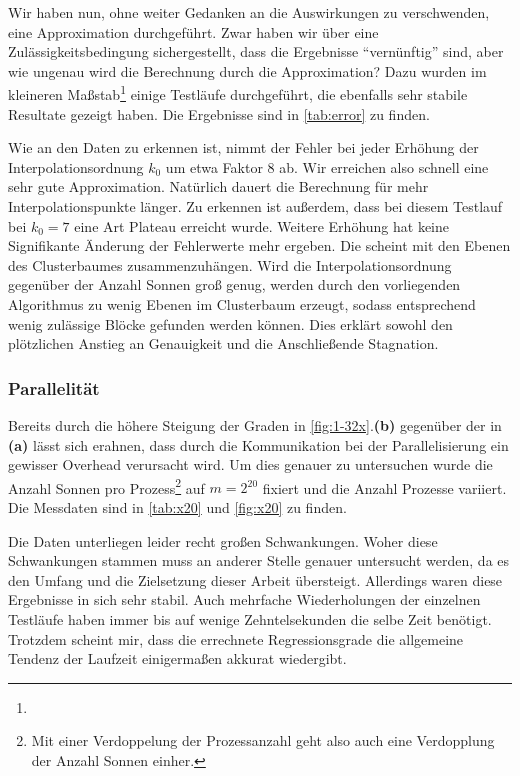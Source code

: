   Wir haben nun, ohne weiter Gedanken an die Auswirkungen zu verschwenden, eine Approximation durchgeführt. Zwar haben wir über eine Zulässigkeitsbedingung sichergestellt, dass die Ergebnisse
  ``vernünftig'' sind, aber wie ungenau wird die Berechnung durch die Approximation? Dazu wurden im kleineren Maßstab\footnote{} einige Testläufe durchgeführt, die ebenfalls sehr stabile Resultate
  gezeigt haben. Die Ergebnisse sind in \autoref{tab:error} zu finden.
  
  Wie an den Daten zu erkennen ist, nimmt der Fehler bei jeder Erhöhung der Interpolationsordnung $k_0$ um etwa Faktor $8$ ab. Wir erreichen also schnell eine sehr gute Approximation. Natürlich
  dauert die Berechnung für mehr Interpolationspunkte länger. Zu erkennen ist außerdem, dass bei diesem Testlauf bei $k_0=7$ eine Art Plateau erreicht wurde. Weitere Erhöhung hat keine Signifikante
  Änderung der Fehlerwerte mehr ergeben. Die scheint mit den Ebenen des Clusterbaumes zusammenzuhängen. Wird die Interpolationsordnung gegenüber der Anzahl Sonnen groß genug, werden durch den
  vorliegenden Algorithmus zu wenig Ebenen im Clusterbaum erzeugt, sodass entsprechend wenig zulässige Blöcke gefunden werden können. Dies erklärt sowohl den plötzlichen Anstieg an Genauigkeit und
  die Anschließende Stagnation.
  
  \subsubsection{Parallelität}
  
  Bereits durch die höhere Steigung der Graden in \autoref{fig:1-32x}.\textbf{(b)} gegenüber der in \textbf{(a)} lässt sich erahnen, dass durch die Kommunikation bei der Parallelisierung ein gewisser
  Overhead verursacht wird. Um dies genauer zu untersuchen wurde die Anzahl Sonnen pro Prozess\footnote{Mit einer Verdoppelung der Prozessanzahl geht also auch eine Verdopplung der Anzahl Sonnen 
  einher.} auf $m = 2^{20}$ fixiert und die Anzahl Prozesse variiert.  Die Messdaten sind in \autoref{tab:x20} und \autoref{fig:x20} zu finden. 
  
  Die Daten unterliegen leider recht großen Schwankungen. Woher diese Schwankungen stammen muss an anderer Stelle genauer untersucht werden, da es den Umfang und die Zielsetzung dieser Arbeit 
  übersteigt. Allerdings waren diese Ergebnisse in sich sehr stabil. Auch mehrfache Wiederholungen der einzelnen Testläufe haben immer bis auf wenige Zehntelsekunden die selbe Zeit benötigt. 
   Trotzdem scheint mir, dass die errechnete Regressionsgrade die allgemeine Tendenz der Laufzeit einigermaßen akkurat wiedergibt.
  

